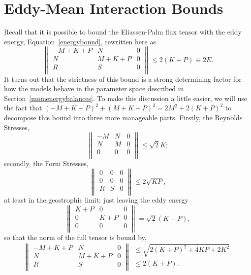 \documentclass[12pt,a4paper]{report}
\newcommand*\equref[1]{Equation~\eqref{#1}}
\newcommand*\secref[1]{Section~\ref{#1}}
\begin{document}
\section{Eddy-Mean Interaction Bounds}

Recall that it is possible to bound the Eliassen-Palm flux tensor with the eddy energy, \equref{energybound}, rewritten here as
\begin{equation}
{\left\|\begin{array}{ccc}
		-M + K + P & N & 0 \\
		N & M + K + P& 0 \\
		R & S & 0 \\
		\end{array}\right\|\leq 2\left(K+P\right)\equiv 2E}.
\end{equation} 
It turns out that the strictness of this bound is
a strong determining factor for how the models behave in the parameter space described in
\secref{momenergybalances}. To make this discussion a little easier, we will use the
fact that $(-M + K + P)^{2}+(M + K + P)^{2} = 2M^{2}+ 2(K + P)^{2}$ to decompose
this bound into three more manageable parts. Firstly, the Reynolds Stresses,
\begin{equation}
{\left\|\begin{array}{ccc}
	-M & N & 0\\
	N & M & 0\\
	0 & 0 & 0\\
	\end{array}\right\|\leq \sqrt{2}K};
\label{reynoldbound}
\end{equation} 
secondly, the Form Stresses,
\begin{equation}
{\left\|\begin{array}{ccc}
	0 & 0 & 0\\
	0 & 0 & 0\\
	R & S & 0\\
	\end{array}\right\|\leq 2\sqrt{KP}},
\end{equation} 
at least in the geostrophic limit;
just leaving the eddy energy
\begin{equation}
{\left\|\begin{array}{ccc}
	K + P & 0 & 0 \\
	0 & K + P & 0\\
	0 & 0 & 0\\
	\end{array}\right\| = \sqrt{2}(K + P)},
\label{formbound}
\end{equation} 
so that the norm of the full tensor is bound by,
\begin{equation}
{\left\|\begin{array}{ccc}
	-M + K + P & N & 0 \\
	N & M + K + P & 0\\
	R & S & 0\\
	\end{array}\right\| 
	\begin{array}{c}
	\leq \sqrt{2(K + P)^{2}+4KP+2K^{2}} \\
	\leq 2(K+P).\\
	\end{array}}
\end{equation} 
\end{document}
